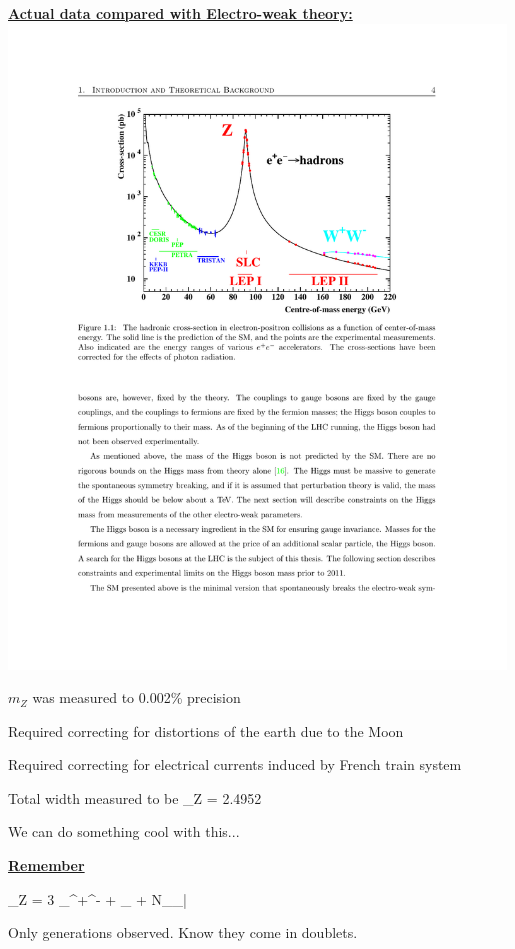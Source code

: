 {\begin{minipage}{\textwidth}
\underline{\textbf{Actual data compared with Electro-weak theory:}}\\
\includegraphics[width=0.99\textwidth]{./LEPData.pdf}
\end{minipage}


$m_Z$ was measured to 0.002\% precision 
\bi
\item[-] Required correcting for distortions of the earth due to the Moon
\item[-] Required correcting for electrical currents induced by French train system
\ei

Total width measured to be 
\be
\Gamma_Z = 2.4952  \GeV
\ee

We can do something cool with this...

\underline{\textbf{Remember}}

\be
\Gamma_Z = 3 \Gamma_{\ell^+\ell^-} + \Gamma_{} + N_\nu \Gamma_{\nu\bar{\nu}}
\ee

Only generations observed.  
Know they come in doublets. 

}
